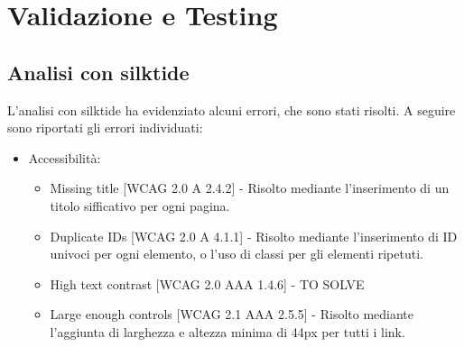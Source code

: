 \section{Validazione e Testing}
\subsection{Analisi con silktide}
L'analisi con silktide ha evidenziato alcuni errori, che sono stati risolti. A seguire sono riportati gli errori individuati:
\begin{itemize}
    \item Accessibilità:
    \begin{itemize}
        \item Missing title [WCAG 2.0 A 2.4.2] - Risolto mediante l'inserimento di un titolo sifficativo per ogni pagina.
        \item Duplicate IDs [WCAG 2.0 A 4.1.1] - Risolto mediante l'inserimento di ID univoci per ogni elemento, o l'uso di classi per gli elementi ripetuti.
        \item High text contrast [WCAG 2.0 AAA 1.4.6] - TO SOLVE
        \item Large enough controls [WCAG 2.1 AAA 2.5.5] - Risolto mediante l'aggiunta di larghezza e altezza minima di 44px per tutti i link.
    \end{itemize}

\end{itemize}

